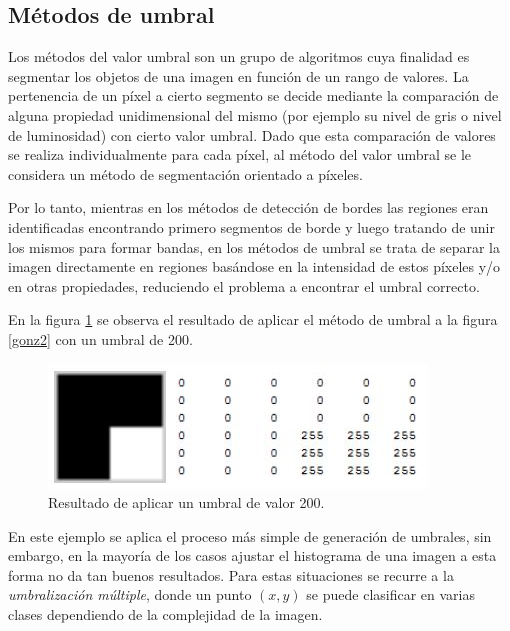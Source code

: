 \subsection{Métodos de umbral} %
\label{umbralSec}

Los métodos del valor umbral son un grupo de algoritmos cuya finalidad es segmentar los objetos de una imagen en función de un rango de valores. La pertenencia de un píxel a cierto segmento se decide mediante la comparación de alguna propiedad unidimensional del mismo (por ejemplo su nivel de gris o nivel de luminosidad) con cierto valor umbral. Dado que esta comparación de valores se realiza individualmente para cada píxel, al método del valor umbral se le considera un método de segmentación orientado a píxeles.

Por lo tanto, mientras en los métodos de detección de bordes las regiones eran identificadas encontrando primero segmentos de borde y luego tratando de unir los mismos para formar bandas, en los métodos de umbral se trata de separar la imagen directamente en regiones basándose en la intensidad de estos píxeles y/o en otras propiedades, reduciendo el problema a encontrar el umbral correcto.

En la figura \ref{gonz3} se observa el resultado de aplicar el método de umbral a la figura \ref{gonz2} con un umbral de 200.

\begin{figure}[H]
\begin{center}
\includegraphics[scale=0.8]{img/03_escala_grises_umbral.jpg}
\end{center}
\caption{Resultado de aplicar un umbral de valor 200.}
\label{gonz3}
\end{figure}


En este ejemplo se aplica el proceso más simple de generación de umbrales, sin embargo, en la mayoría de los casos ajustar el histograma de una imagen a esta forma no da tan buenos resultados. Para estas situaciones se recurre a la \textit{umbralización múltiple}, donde un punto $(x,y)$ se puede clasificar en varias clases dependiendo de la complejidad de la imagen.

